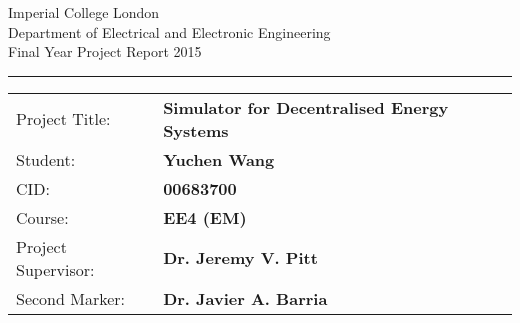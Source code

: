 \documentclass[11pt,a4paper,twoside]{memoir} %
\begin{document}
%
\begin{titlingpage}
                \setlength{\parindent}{0pt}
                \setlength{\parskip}{0pt}

                {
                                \Large
                                \raggedright
                                Imperial College London\\[17pt]
                                Department of Electrical and Electronic Engineering\\[17pt]
                                Final Year Project Report 2015\\[17pt]
 
                }

                \rule{\columnwidth}{3pt}
                \vfill
                \centering
                \vfill
                \setlength{\tabcolsep}{0pt}

                \begin{tabular}{p{40mm}p{\dimexpr\columnwidth-40mm}}
                                Project Title: & \textbf{Simulator for Decentralised Energy Systems} \\[12pt]
                                Student: & \textbf{Yuchen Wang} \\[12pt]
                                CID: & \textbf{00683700} \\[12pt]
                                Course: & \textbf{EE4 (EM)} \\[12pt]
                                Project Supervisor: & \textbf{Dr. Jeremy V. Pitt} \\[12pt]
                                Second Marker: & \textbf{Dr. Javier A. Barria} \\
                \end{tabular}
\end{titlingpage}


\frontmatter %

\end{document}
